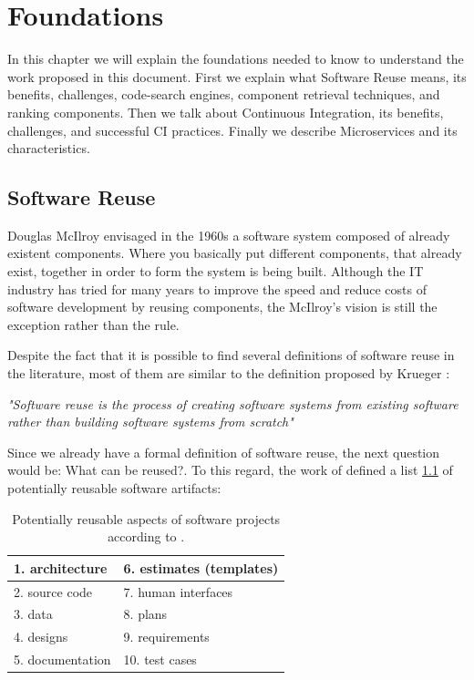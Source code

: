 \chapter{Foundations}
\label{foundations}
In this chapter we will explain the foundations needed to know to understand the work proposed in this document. First we explain what Software Reuse means, its benefits, challenges, code-search engines, component retrieval techniques, and ranking components. Then we talk about Continuous Integration, its benefits, challenges, and successful CI practices. Finally we describe Microservices and its characteristics.
\section{Software Reuse}
\label{chap:sw-reuse}
Douglas McIlroy \cite{McIlroy1968} envisaged in the 1960s a software system composed of already existent components. Where you basically put different components, that already exist, together in order to form the system is being built. Although the IT industry has tried for many years to improve the speed and reduce costs of software development by reusing components, the McIlroy's vision is still the exception rather than the rule.

Despite the fact that it is possible to find several definitions of software reuse in the literature, most of them are similar to the definition proposed by Krueger \cite{Krueger1992}:

\textit{"Software reuse is the process of creating software systems from existing software rather than building software systems from scratch"}

Since we already have a formal definition of software reuse, the next question would be: What can be reused?. To this regard, the work of \cite{Frakes1996} defined a list \ref{reusable-list} of potentially reusable software artifacts:

\begin{table}[]
\centering
\label{reusable-list}
	\begin{tabular}{|l|l|}
		\hline
		1. architecture						 & 6. estimates (templates) \\ \hline
		2. source code  						 & 7. human interfaces      \\ \hline
		3. data                               & 8. plans                 \\ \hline
		4. designs                            & 9. requirements          \\ \hline
		5. documentation                      & 10. test cases           \\ \hline
	\end{tabular}
	\caption{Potentially reusable aspects of software projects according to \cite{Frakes1996}.}
\end{table}

